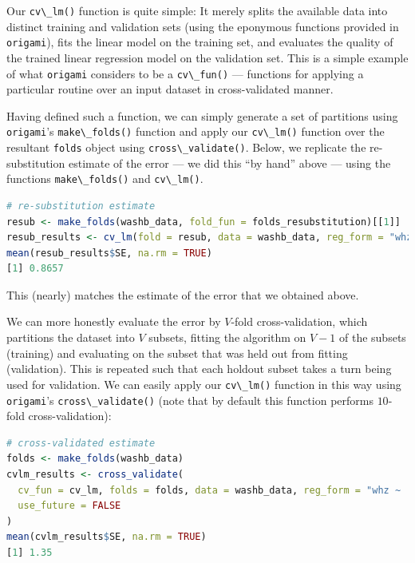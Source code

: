 \documentclass[
  12pt, krantz2,
]{krantz}
\newcommand{\passthrough}[1]{#1}
\newcommand{\1}{\mathbbm{1}}
\theoremstyle{definition}
\theoremstyle{definition}
\theoremstyle{definition}
\theoremstyle{definition}
\theoremstyle{remark}
\begin{document}
Our \passthrough{\lstinline!cv\_lm()!} function is quite simple: It merely splits the available data into
distinct training and validation sets (using the eponymous functions provided in
\passthrough{\lstinline!origami!}), fits the linear model on the training set, and evaluates the quality
of the trained linear regression model on the validation set. This is a simple
example of what \passthrough{\lstinline!origami!} considers to be a \passthrough{\lstinline!cv\_fun()!} --- functions for applying
a particular routine over an input dataset in cross-validated manner.

Having defined such a function, we can simply generate a set of partitions using
\passthrough{\lstinline!origami!}'s \passthrough{\lstinline!make\_folds()!} function and apply our \passthrough{\lstinline!cv\_lm()!} function over the
resultant \passthrough{\lstinline!folds!} object using \passthrough{\lstinline!cross\_validate()!}. Below, we replicate the
re-substitution estimate of the error --- we did this ``by hand'' above --- using the
functions \passthrough{\lstinline!make\_folds()!} and \passthrough{\lstinline!cv\_lm()!}.

\begin{lstlisting}[language=R]
# re-substitution estimate
resub <- make_folds(washb_data, fold_fun = folds_resubstitution)[[1]]
resub_results <- cv_lm(fold = resub, data = washb_data, reg_form = "whz ~ .")
mean(resub_results$SE, na.rm = TRUE)
[1] 0.8657
\end{lstlisting}

This (nearly) matches the estimate of the error that we obtained above.

We can more honestly evaluate the error by \(V\)-fold cross-validation, which
partitions the dataset into \(V\) subsets, fitting the algorithm on \(V - 1\) of the
subsets (training) and evaluating on the subset that was held out from
fitting (validation). This is repeated such that each holdout subset
takes a turn being used for validation. We can easily apply our \passthrough{\lstinline!cv\_lm()!}
function in this way using \passthrough{\lstinline!origami!}'s \passthrough{\lstinline!cross\_validate()!} (note that by default
this function performs \(10\)-fold cross-validation):

\begin{lstlisting}[language=R]
# cross-validated estimate
folds <- make_folds(washb_data)
cvlm_results <- cross_validate(
  cv_fun = cv_lm, folds = folds, data = washb_data, reg_form = "whz ~ .",
  use_future = FALSE
)
mean(cvlm_results$SE, na.rm = TRUE)
[1] 1.35
\end{lstlisting}
\end{document}
